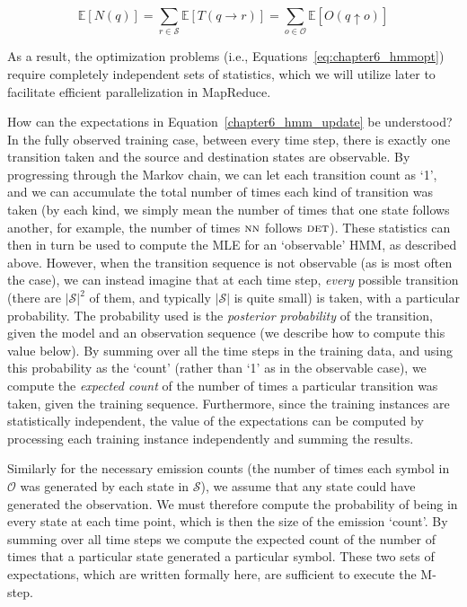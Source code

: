 \begin{equation}
\mathbb{E}[N(q)] = \sum_{r \in \mathcal{S}} \mathbb{E}[T(q \rightarrow r)] = \sum_{o \in \mathcal{O}} \mathbb{E}[O(q \uparrow o)]
\end{equation}

\noindent As a result, the optimization problems (i.e.,
Equations~\ref{eq:chapter6_hmmopt}) require completely independent
sets of statistics, which we will utilize later to facilitate
efficient parallelization in MapReduce.

How can the expectations in Equation~\ref{chapter6_hmm_update} be
understood?  In the fully observed training case, between every time
step, there is exactly one transition taken and the source and
destination states are observable.  By progressing through the Markov
chain, we can let each transition count as `1', and we can accumulate
the total number of times each kind of transition was taken (by each
kind, we simply mean the number of times that one state follows
another, for example, the number of times $\textsc{nn}$ follows
$\textsc{det}$).  These statistics can then in turn be used to compute
the MLE for an `observable' HMM, as described above.  However, when
the transition sequence is not observable (as is most often the case),
we can instead imagine that at each time step, \emph{every} possible
transition (there are $|\mathcal{S}|^2$ of them, and typically
$|\mathcal{S}|$ is quite small) is taken, with a particular
probability.  The probability used is the \emph{posterior probability}
of the transition, given the model and an observation sequence (we
describe how to compute this value below).  By summing over all the
time steps in the training data, and using this probability as the
`count' (rather than `1' as in the observable case), we compute the
\emph{expected count} of the number of times a particular transition
was taken, given the training sequence.  Furthermore, since the
training instances are statistically independent, the value of the
expectations can be computed by processing each training instance
independently and summing the results.

Similarly for the necessary emission counts (the number of times each
symbol in $\mathcal{O}$ was generated by each state in $\mathcal{S}$),
we assume that any state could have generated the observation.  We
must therefore compute the probability of being in every state at each
time point, which is then the size of the emission `count'.  By
summing over all time steps we compute the expected count of the
number of times that a particular state generated a particular symbol.
These two sets of expectations, which are written formally here, are
sufficient to execute the M-step.

